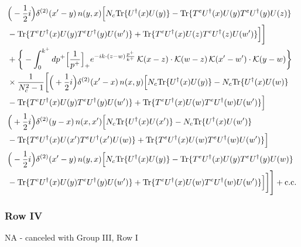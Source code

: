 \documentclass[9pt]{article}
\numberwithin{equation}{section}
\begin{document}
\begin{align}
& \Big(-\frac{1}{2}i\Big)\delta^{(2)}(x'-y)\,n(y,x)\Big[N_{c}{\rm Tr}\{U^{\dagger}(x)U(y)\}-{\rm Tr}\{T^{e}U^{\dagger}(x)U(y)T^{e}U^{\dagger}(y)U(z)\}\notag\\
& -{\rm Tr}\{T^{e}U^{\dagger}(x)U(y)T^{e}U^{\dagger}(y)U(w')\}+{\rm Tr}\{T^{e}U^{\dagger}(x)U(z)T^{e}U^{\dagger}(z)U(w')\}\Big]\bigg]\notag\\
&+\bigg\{-\int_{0}^{k^{+}}dp^{+}\Big[\frac{1}{p^{+}}\Big]_{+}e^{-ik\cdot(z-w)\frac{p^{+}}{k^{+}}}\,\mathcal{K}(x-z)\cdot\mathcal{K}(w-z)\,\mathcal{K}(x'-w')\cdot\mathcal{K}(y-w)\bigg\}\notag\\
&\times \frac{1}{N_{c}^{2}-1}\bigg[\Big(+\frac{1}{2}i\Big)\delta^{(2)}(x'-x)\,n(x,y)\Big[N_{c}{\rm Tr}\{U^{\dagger}(x)U(y)\}-N_{c}{\rm Tr}\{U^{\dagger}(x)U(w)\}\notag\\
& -{\rm Tr}\{T^{e}U^{\dagger}(x)U(y)T^{e}U^{\dagger}(y)U(w')\}+{\rm Tr}\{T^{e}U^{\dagger}(x)U(w)T^{e}U^{\dagger}(w)U(w')\}\Big]\notag\\
& \Big(+\frac{1}{2}i\Big)\delta^{(2)}(y-x)\,n(x,x')\Big[N_{c}{\rm Tr}\{U^{\dagger}(x)U(x')\}-N_{c}{\rm Tr}\{U^{\dagger}(x)U(w')\}\notag\\
& -{\rm Tr}\{T^{e}U^{\dagger}(x)U(x')T^{e}U^{\dagger}(x')U(w)\}+{\rm Tr}\{T^{e}U^{\dagger}(x)U(w)T^{e}U^{\dagger}(w)U(w')\}\Big]\notag\\
& \Big(-\frac{1}{2}i\Big)\delta^{(2)}(x'-y)\,n(y,x)\Big[N_{c}{\rm Tr}\{U^{\dagger}(x)U(y)\}-{\rm Tr}\{T^{e}U^{\dagger}(x)U(y)T^{e}U^{\dagger}(y)U(w)\}\notag\\
& -{\rm Tr}\{T^{e}U^{\dagger}(x)U(y)T^{e}U^{\dagger}(y)U(w')\}+{\rm Tr}\{T^{e}U^{\dagger}(x)U(w)T^{e}U^{\dagger}(w)U(w')\}\Big]\bigg]\Bigg]+{\rm c.c.}\label{eq:E-I.III-2}
\end{align}
\subsubsection*{Row IV}
\textsc{NA} - canceled with Group III, Row I
\end{document}
